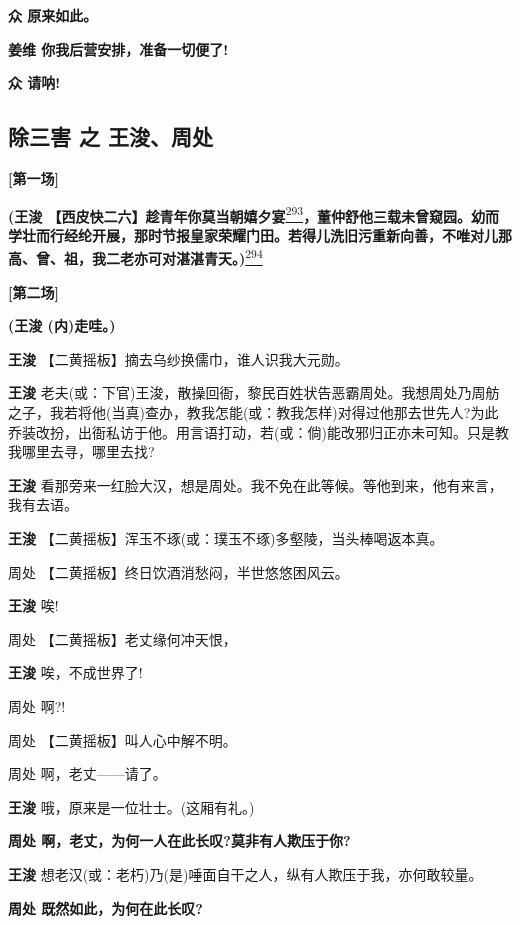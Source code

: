 \textbf{众 原来如此。}

\textbf{姜维 你我后营安排，准备一切便了!}

\textbf{众 请呐!}

\newpage
\hypertarget{ux9664ux4e09ux5bb3-ux4e4b-ux738bux6d5aux5468ux5904}{%
\subsection{除三害 之
王浚、周处}\label{ux9664ux4e09ux5bb3-ux4e4b-ux738bux6d5aux5468ux5904}}

\textbf{{[}第一场{]}}

\textbf{(王浚
【西皮快二六】趁青年你莫当朝嬉夕宴}\protect\hyperlink{fn293}{\textsuperscript{293}}\textbf{，董仲舒他三载未曾窥园。幼而学壮而行经纶开展，那时节报皇家荣耀门田。若得儿洗旧污重新向善，不唯对儿那高、曾、祖，我二老亦可对湛湛青天。)}\protect\hyperlink{fn294}{\textsuperscript{294}}

\textbf{{[}第二场{]}}

\textbf{(王浚 (内)走哇。)}

\textbf{王浚} 【二黄摇板】摘去乌纱换儒巾，谁人识我大元勋。

\textbf{王浚}
老夫(或：下官)王浚，散操回衙，黎民百姓状告恶霸周处。我想周处乃周舫之子，我若将他(当真)查办，教我怎能(或：教我怎样)对得过他那去世先人?为此乔装改扮，出衙私访于他。用言语打动，若(或：倘)能改邪归正亦未可知。只是教我哪里去寻，哪里去找?

\textbf{王浚}
看那旁来一红脸大汉，想是周处。我不免在此等候。等他到来，他有来言，我有去语。

\textbf{王浚} 【二黄摇板】浑玉不琢(或：璞玉不琢)多壑陵，当头棒喝返本真。

周处 【二黄摇板】终日饮酒消愁闷，半世悠悠困风云。

\textbf{王浚} 唉!

周处 【二黄摇板】老丈缘何冲天恨，

\textbf{王浚} 唉，不成世界了!

周处 啊?!

周处 【二黄摇板】叫人心中解不明。

周处 啊，老丈------请了。

\textbf{王浚} 哦，原来是一位壮士。(这厢有礼。)

\textbf{周处 啊，老丈，为何一人在此长叹?莫非有人欺压于你?}

\textbf{王浚}
想老汉(或：老朽)乃(是)唾面自干之人，纵有人欺压于我，亦何敢较量。

\textbf{周处 既然如此，为何在此长叹?}

